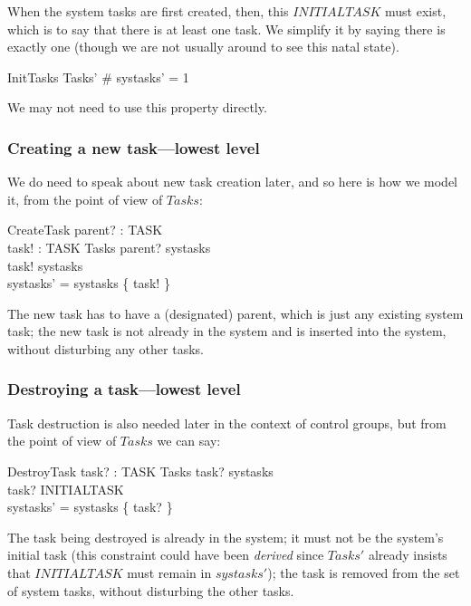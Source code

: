 \documentclass[a4paper,twoside,12pt]{article}
\begin{document}
When the system tasks are first created, then, this $INITIALTASK$ must exist, which is to say that there is at least one task. We simplify it by saying there is exactly one (though we are not usually around to see this natal state).

\begin{schema}{InitTasks}
Tasks'
\where
\# systasks' = 1
\end{schema}
We may not need to use this property directly.

\subsubsection{Creating a new task---lowest level}

We do need to speak about new task creation later, and so here is how we model it, from the point of view of $Tasks$:

\begin{schema}{CreateTask}
parent? : TASK \\
task! : TASK
\also
\Delta Tasks
\where
parent? \in systasks \\
task! \notin systasks \\
systasks' = systasks \cup \{ task! \}
\end{schema}
The new task has to have a (designated) parent, which is just any existing system task; the new task is not already
in the system and is inserted into the system, without disturbing any other tasks.

\subsubsection{Destroying a task---lowest level}

Task destruction is also needed later in the context of control groups, but from the point of view of $Tasks$ we can say:

\begin{schema}{DestroyTask}
task? : TASK
\also
\Delta Tasks
\where
task? \in systasks \\
task? \neq INITIALTASK \\
systasks'  = systasks \setminus \{ task? \}
\end{schema}
The task being destroyed is already in the system; it must not be the system's initial task 
(this constraint could have been \emph{derived} since $Tasks'$ already insists that $INITIALTASK$ 
must remain in $systasks'$);
the task is removed from the set of system tasks, without disturbing the other tasks.
\end{document}
